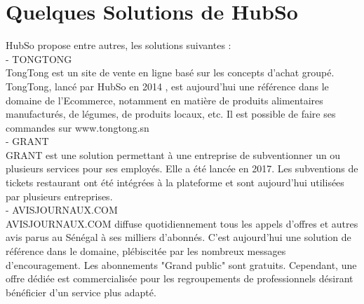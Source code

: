 \section{Quelques Solutions de HubSo }
HubSo propose entre autres, les solutions suivantes : \\
- TONGTONG \\
TongTong est un site de vente en ligne basé sur les concepts d'achat groupé. TongTong, lancé par HubSo en 2014 , est aujourd'hui une référence dans le domaine de l'Ecommerce, notamment en matière de produits alimentaires manufacturés, de légumes, de produits locaux, etc. Il est possible de faire ses commandes sur www.tongtong.sn \\
- GRANT \\
GRANT est une solution permettant à une entreprise de subventionner un ou plusieurs services pour ses employés. Elle a été lancée en 2017. Les subventions de tickets restaurant ont été intégrées à la plateforme et sont aujourd'hui utilisées par plusieurs entreprises.\\
- AVISJOURNAUX.COM \\
AVISJOURNAUX.COM diffuse quotidiennement tous les appels d'offres et autres avis parus au Sénégal à ses milliers d'abonnés. C'est aujourd'hui une solution de référence dans le domaine, plébiscitée par les nombreux messages d'encouragement. Les abonnements "Grand public" sont gratuits. Cependant, une offre dédiée est commercialisée pour les regroupements de professionnels désirant bénéficier d'un service plus adapté. 

